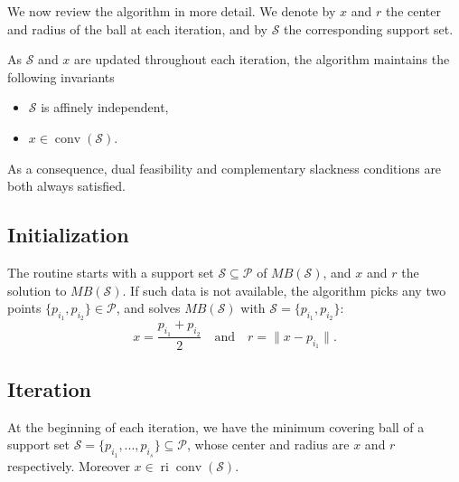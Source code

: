 \medskip

We now review the algorithm in more detail. We denote by $x$ and $r$ the center and radius of the ball at each iteration, and by ${\mathcal{S}}$ the corresponding support set. 

As ${\mathcal{S}}$ and $x$ are updated throughout each iteration, the algorithm maintains the following invariants
\begin{itemize} 
	\item ${\mathcal{S}}$ is affinely independent, 
	\item $x\in{\operatorname{conv}}({\mathcal{S}})$.
\end{itemize}
\noindent As a consequence, dual feasibility and complementary slackness conditions are both always satisfied.

\subsection{Initialization}
The routine starts with a support set ${\mathcal{S}}\subseteq{\mathcal{P}}$ of $MB({\mathcal{S}})$, and $x$ and $r$ the solution to $MB({\mathcal{S}})$. If such data is not available, the algorithm picks any two points $\{p_{i_1}, p_{i_2}\} \in {\mathcal{P}}$, and solves $MB({\mathcal{S}})$ with ${\mathcal{S}}=\{p_{i_1},p_{i_2}\}$:
	$$x = \frac{p_{i_1}+p_{i_2}}2\quad\text{and}\quad r = \|x-p_{i_1}\|.$$
	
\subsection{Iteration}	
	At the beginning of each iteration, we have the minimum covering ball of a support set ${\mathcal{S}}= \{p_{i_1}, . . . , p_{i_s}\}\subseteq {\mathcal{P}}$, whose center and radius are $x$ and $r$ respectively. Moreover $x\in{\operatorname{ri}} {\operatorname{conv}} ({\mathcal{S}})$.
	
	\medskip
	
